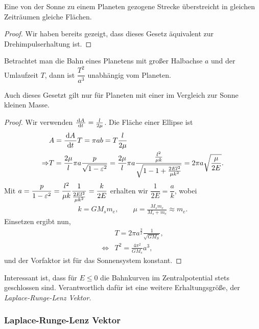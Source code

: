 \begin{propn}
Eine von der Sonne zu einem Planeten gezogene Strecke überstreicht in gleichen
Zeiträumen gleiche Flächen.\fishhere
\end{propn}
\begin{proof}
Wir haben bereits gezeigt, dass dieses Gesetz äquivalent zur Drehimpulserhaltung
ist.\qedhere
\end{proof}

\begin{propn} Betrachtet man die Bahn eines Planetens
mit großer Halbachse $a$ und der Umlaufzeit $T$, dann ist 
$\dfrac{T^2}{a^3}$ unabhängig vom Planeten.\fishhere
\end{propn}
Auch dieses Gesetzt gilt nur für Planeten mit einer im Vergleich zur Sonne
kleinen Masse.
\begin{proof}
Wir verwenden $\frac{\,\mathrm{d} A\,}{\,\mathrm{d} t\,} = \frac{l}{2\mu}$. Die Fläche einer Ellipse ist
\begin{align*}
&A = \frac{\,\mathrm{d} A\,}{\,\mathrm{d} t\,}T = \pi a b = T\frac{l}{2\mu}\\
\Rightarrow & T = \frac{2\mu}{l}\pi a \frac{p}{\sqrt{1-\varepsilon^2}}
= \frac{2\mu}{l}\pi a\frac{\frac{l^2}{\mu k}}{\sqrt{1-1+\frac{2El^2}{\mu k^2}}}
= 2\pi a\sqrt{\frac{\mu}{2E}}.
\end{align*}
Mit $a = \dfrac{p}{1-\varepsilon^2} = \dfrac{l^2}{\mu k}\dfrac{1}{\frac{2El^2}{\mu k^2}}
= \dfrac{k}{2E}$ erhalten wir $\dfrac{1}{2E} = \dfrac{a}{k}$, wobei
\begin{align*}
k = G M_s m_e,\qquad \mu = \frac{M_s m_e}{M_s+m_e}\approx m_e.
\end{align*}
Einsetzen ergibt nun,
\begin{align*}
&T = 2\pi a^{\frac{3}{2}}\frac{1}{\sqrt{G M_S}},\\
\Leftrightarrow & T^2 = \frac{4\pi^2}{G M_s}a^3,
\end{align*}
und der Vorfaktor ist für das Sonnensystem konstant.\qedhere
\end{proof}

Interessant ist, dass für $E\le 0$ die Bahnkurven im Zentralpotential stets
geschlossen sind. Verantwortlich dafür ist eine weitere
Erhaltungsgröße, der \emph{Laplace-Runge-Lenz Vektor}.

\subsubsection{Laplace-Runge-Lenz Vektor}

